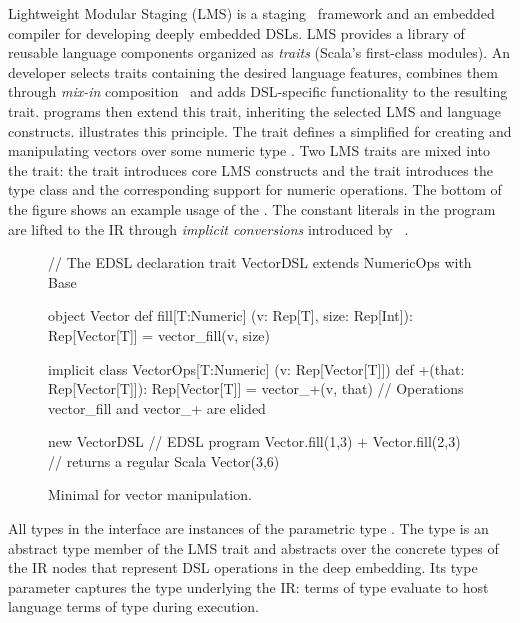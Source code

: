 Lightweight Modular Staging (LMS) is a
staging~\cite{taha_multi-stage_1997} framework and an embedded
compiler for developing deeply embedded DSLs.  LMS provides a library
of reusable language components organized as \emph{traits} (Scala's
first-class modules).  An \edsl developer selects traits containing
the desired language features, combines them through \emph{mix-in}
composition~\cite{odersky_scalable_2005} and adds DSL-specific
functionality to the resulting \edsl trait.  \edsl programs then
extend this trait, inheriting the selected LMS and \edsl language
constructs.  illustrates this principle.  The trait
 defines a simplified \edsl for creating and
manipulating vectors over some numeric type .  Two LMS traits
are mixed into the  trait: the  trait
introduces core LMS constructs %
and the  trait introduces the  type
class and the corresponding support for numeric operations.  The
bottom of the figure shows an example usage of the \edsl. The constant
literals in the program are lifted to the IR through \emph{implicit
  conversions} introduced by
~\cite{oliveira_type_2010}.

\begin{figure}
\begin{listingtiny}
// The EDSL declaration
trait VectorDSL extends NumericOps with Base {
  object Vector {
    def fill[T:Numeric]
      (v: Rep[T], size: Rep[Int]): Rep[Vector[T]] =
      vector_fill(v, size)
  }

  implicit class VectorOps[T:Numeric]
    (v: Rep[Vector[T]]) {
    def +(that: Rep[Vector[T]]): Rep[Vector[T]] =
      vector_+(v, that)
  }
  // Operations vector_fill and vector_+ are elided
}

new VectorDSL { // EDSL program
  Vector.fill(1,3) + Vector.fill(2,3)
} // returns a regular Scala Vector(3,6)
\end{listingtiny}
\caption{\label{lst:lms} Minimal \edsl for vector manipulation.}
\end{figure}

All types in the  interface are instances of the
parametric type .  The  type is an abstract
type member of the  LMS trait and abstracts over the
concrete types of the IR nodes that represent DSL operations in the
deep embedding.  Its type parameter captures the type underlying the
IR: \edsl terms of type  evaluate to host language terms
of type  during \edsl execution.

